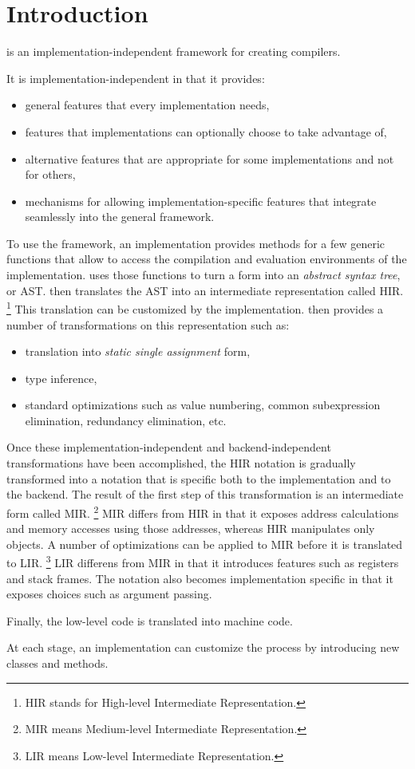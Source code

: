 \chapter{Introduction}
%

\sysname{} is an implementation-independent framework for creating
\commonlisp{} compilers. 

It is implementation-independent in that it provides:

\begin{itemize}
\item general features that every implementation needs,
\item features that implementations can optionally choose to take
  advantage of, 
\item alternative features that are appropriate for some
  implementations and not for others,
\item mechanisms for allowing implementation-specific features that
  integrate seamlessly into the general framework.
\end{itemize}

To use the framework, an implementation provides methods for a few
generic functions that allow \sysname{} to access the compilation and
evaluation environments of the implementation.  \sysname{} uses those
functions to turn a form into an \emph{abstract syntax tree}, or AST.
 \sysname{} then translates the AST
into an intermediate representation called HIR.%
\footnote{HIR stands for High-level Intermediate Representation.}
This translation can be customized by the implementation.  \sysname{}
then provides a number of transformations on this representation such
as:

\begin{itemize}
\item translation into \emph{static single assignment} form,
\item type inference,
\item standard optimizations such as value numbering, common
  subexpression elimination, redundancy elimination, etc.
\end{itemize}

Once these implementation-independent and backend-independent
transformations have been accomplished, the HIR notation is gradually
transformed into a notation that is specific both to the
implementation and to the backend.  The result of the first step of
this transformation is an intermediate form called MIR.%
\footnote{MIR means Medium-level Intermediate Representation.}  MIR
differs from HIR in that it exposes address calculations and memory
accesses using those addresses, whereas HIR manipulates only
\commonlisp{} objects.  A number of optimizations can be applied to
MIR before it is translated to LIR.%
\footnote{LIR means Low-level Intermediate Representation.}
LIR differens from MIR in that it introduces features such as
registers and stack frames.  The notation also becomes implementation
specific in that it exposes choices such as argument passing.

Finally, the low-level code is translated into machine code.

At each stage, an implementation can customize the process by
introducing new classes and methods. 
